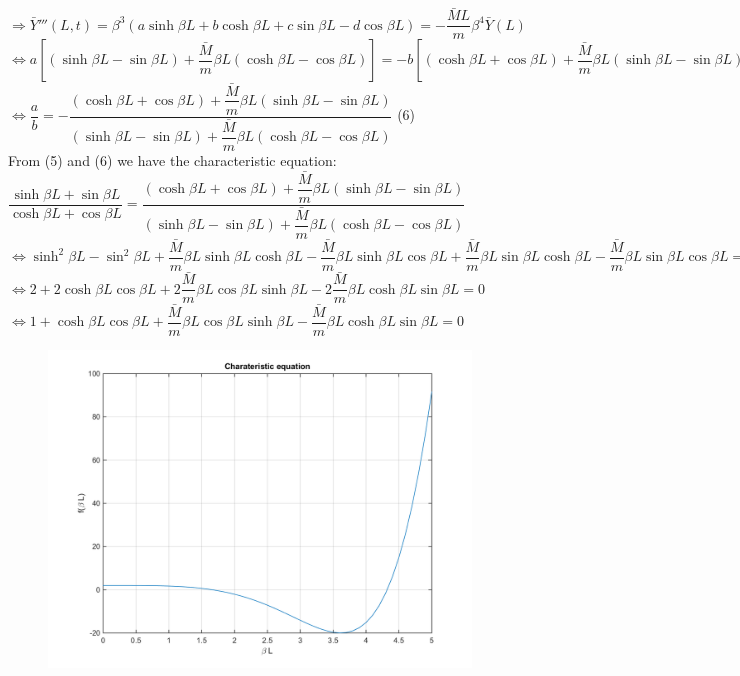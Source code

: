 \documentclass[14pt,a4paper]{article}
\begin{document}
\begin{enumerate}
	$\Rightarrow \bar{Y}'''(L,t) = \beta^3 \left(a \sinh \beta L + b \cosh \beta L + c \sin \beta L - d \cos \beta L\right) = -\dfrac{\bar{M}L}{m}\beta^4\bar{Y}(L)$ \\ 
	$\Leftrightarrow a\left[(\sinh\beta L - \sin\beta L)+\dfrac{\bar{M}}{m}\beta L(\cosh\beta L - \cos\beta L)\right] = -b\left[(\cosh\beta L + \cos\beta L) +\dfrac{\bar{M}}{m}\beta L(\sinh\beta L - \sin\beta L)\right]$\\
	$\Leftrightarrow \dfrac{a}{b} = -\dfrac{(\cosh\beta L + \cos\beta L) +\dfrac{\bar{M}}{m}\beta L(\sinh\beta L - \sin\beta L)}{(\sinh\beta L - \sin\beta L)+\dfrac{\bar{M}}{m}\beta L(\cosh\beta L - \cos\beta L)} $ \hspace{3.8cm} (6) \\
	 
	From (5) and (6) we have the characteristic equation:\\
	$ \dfrac{ \sinh\beta L + \sin \beta L}{\cosh \beta L + \cos \beta L} = \dfrac{(\cosh\beta L + \cos\beta L) +\dfrac{\bar{M}}{m}\beta L(\sinh\beta L - \sin\beta L)}{(\sinh\beta L - \sin\beta L)+\dfrac{\bar{M}}{m}\beta L(\cosh\beta L - \cos\beta L)} $\\
	$\Leftrightarrow \sinh^2\beta L - \sin^2\beta L + \dfrac{\bar{M}}{m}\beta L\sinh\beta L\cosh\beta L - \dfrac{\bar{M}}{m}\beta L\sinh\beta L\cos\beta L + \dfrac{\bar{M}}{m}\beta L\sin\beta L\cosh\beta L - \dfrac{\bar{M}}{m}\beta L\sin\beta L\cos\beta L = \cosh^2\beta L + 2\cosh\beta L\cos\beta L + \cos^2\beta L + \dfrac{\bar{M}}{m}\beta L\sinh\beta L\cosh\beta L - \dfrac{\bar{M}}{m}\beta L\cosh\beta L\sin\beta L + \dfrac{\bar{M}}{m}\beta L\cos\beta L\sinh\beta L - \dfrac{\bar{M}}{m}\beta L\cos\beta L\sin\beta L 	$ \\
	$\Leftrightarrow 2 + 2\cosh\beta L\cos\beta L + 2\dfrac{\bar{M}}{m}\beta L\cos\beta L\sinh\beta L - 2\dfrac{\bar{M}}{m}\beta L\cosh\beta L\sin\beta L = 0$\\
	$\Leftrightarrow 1 + \cosh\beta L\cos\beta L + \dfrac{\bar{M}}{m}\beta L\cos\beta L\sinh\beta L - \dfrac{\bar{M}}{m}\beta L\cosh\beta L\sin\beta L = 0$
	\begin{figure}[htp]
		\centering
		\includegraphics[scale=0.5]{hw2_VB2.png}

\end{figure}
\end{enumerate}
\end{document}
